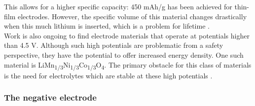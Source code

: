 \documentclass[12pt]{article} %
\begin{document}
This allows for a higher specific capacity: 450 mAh/g has been achieved for thin-film electrodes.
However, the specific volume of this material changes drastically when this much lithium is inserted, which is a problem for lifetime \cite{kulova_new_2013}.
\\
Work is also ongoing to find electrode materials that operate at potentials higher than 4.5 V.
Although such high potentials are problematic from a safety perspective, they have the potential to offer increased energy density.
One such material is LiMn\textsubscript{1/3}Ni\textsubscript{1/3}Co\textsubscript{1/3}O\textsubscript{4}.
The primary obstacle for this class of materials is the need for electrolytes which are stable at these high potentials \cite{kulova_new_2013}.


\subsubsection{The negative electrode} %
\end{document}
